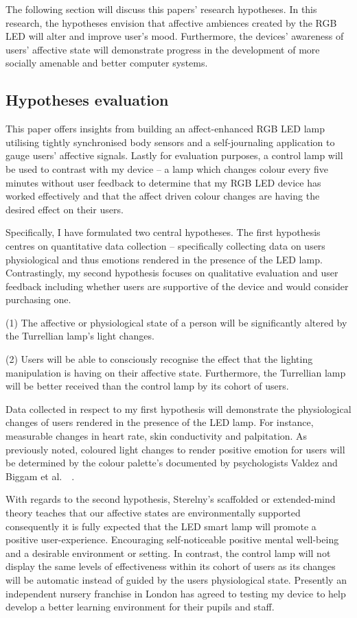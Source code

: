 \documentclass{sigchi}
\begin{document}
The following section will discuss this papers’ research hypotheses. In this research, the hypotheses envision that affective ambiences created by the RGB LED will alter and improve user’s mood. Furthermore, the devices’ awareness of users’ affective state will demonstrate progress in the development of more socially amenable and better computer systems. 

\subsection{Hypotheses evaluation}

This paper offers insights from building an affect-enhanced RGB LED lamp utilising tightly synchronised body sensors and a self-journaling application to gauge users’ affective signals. Lastly for evaluation purposes, a control lamp will be used to contrast with my device – a lamp which changes colour every five minutes without user feedback to determine that my RGB LED device has worked effectively and that the affect driven colour changes are having the desired effect on their users.

Specifically, I have formulated two central hypotheses. The first hypothesis centres on quantitative data collection – specifically collecting data on users physiological and thus emotions rendered in the presence of the LED lamp. Contrastingly, my second hypothesis focuses on qualitative evaluation and user feedback including whether users are supportive of the device and would consider purchasing one. 

(1) The affective or physiological state of a person will be significantly altered by the Turrellian lamp’s light changes.

(2) Users will be able to consciously recognise the effect that the lighting manipulation is having on their affective state. Furthermore, the Turrellian lamp will be better received than the control lamp by its cohort of users.

Data collected in respect to my first hypothesis will demonstrate the physiological changes of users rendered in the presence of the LED lamp. For instance, measurable changes in heart rate, skin conductivity and palpitation. As previously noted, coloured light changes to render positive emotion for users will be determined by the colour palette’s documented by psychologists Valdez and Biggam et al.~\cite{biggam2006progress}~\cite{valdez1994effects}. 

With regards to the second hypothesis, Sterelny’s scaffolded or extended-mind theory teaches that our affective states are environmentally supported~\cite{sterelny2010minds}~\cite{sterelny2004externalism} consequently it is fully expected that the LED smart lamp will promote a positive user-experience. Encouraging self-noticeable positive mental well-being and a desirable environment or setting. In contrast, the control lamp will not display the same levels of effectiveness within its cohort of users as its changes will be automatic instead of guided by the users physiological state. Presently an independent nursery franchise in London has agreed to testing my device to help develop a better learning environment for their pupils and staff.
\end{document}
